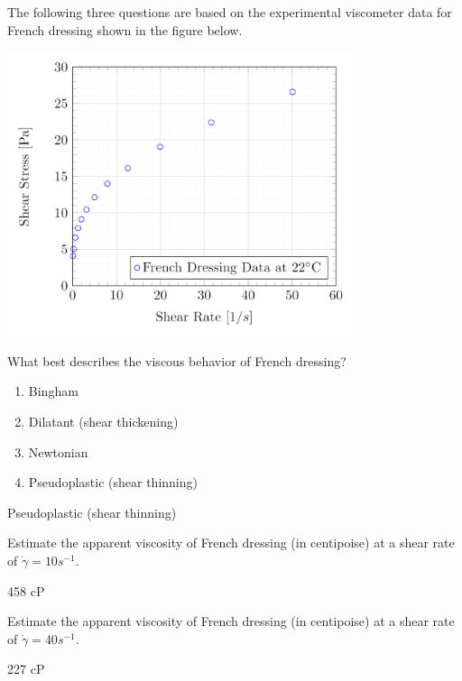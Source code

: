\documentclass[multi,preview,varwidth=false,border=5,12pt]{standalone}
\begin{document}
\begin{question}

The following three questions are based on the experimental viscometer data for French dressing shown in the figure below.

 \includegraphics[width=4in]{imgs/FrenchDressing.png}

What best describes the viscous behavior of French dressing?

\begin{enumerate}
  \item Bingham
  \item Dilatant (shear thickening)
  \item Newtonian
  \item Pseudoplastic (shear thinning)
\end{enumerate}

\begin{solution}
Pseudoplastic (shear thinning)
\end{solution}

\end{question}


\begin{question}

 Estimate the apparent viscosity of French dressing (in centipoise) at a shear rate of $\dot{\gamma}=10 s^{-1}$.

\begin{solution}
458 cP
\end{solution}

\end{question}

\begin{question}

 Estimate the apparent viscosity of French dressing (in centipoise) at a shear rate of $\dot{\gamma}=40 s^{-1}$.

\begin{solution}
227 cP
\end{solution}

\end{question}
\end{document}
